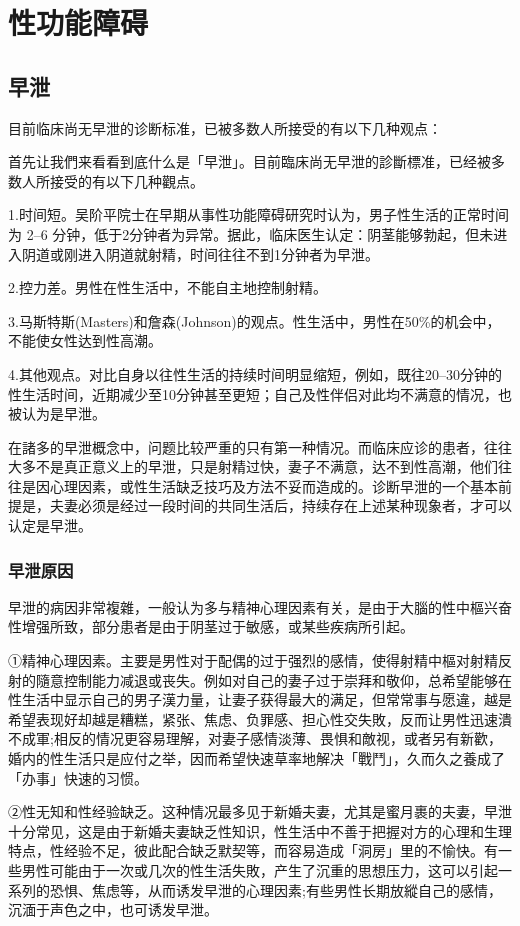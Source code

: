 \documentclass[12pt,UTF8]{ctexbook}
\begin{document}
\part{性功能障碍}

\chapter{早泄}

目前临床尚无早泄的诊断标准，已被多数人所接受的有以下几种观点：

首先让我們来看看到底什么是「早泄」。目前臨床尚无早泄的診斷標准，已经被多数人所接受的有以下几种觀点。

1.时间短。吴阶平院士在早期从事性功能障碍研究时认为，男子性生活的正常时间为 2--6 分钟，低于2分钟者为异常。据此，临床医生认定：阴茎能够勃起，但未进入阴道或刚进入阴道就射精，时间往往不到1分钟者为早泄。

2.控力差。男性在性生活中，不能自主地控制射精。

3.马斯特斯(Masters)和詹森(Johnson)的观点。性生活中，男性在50\%的机会中，不能使女性达到性高潮。

4.其他观点。对比自身以往性生活的持续时间明显缩短，例如，既往20--30分钟的性生活时间，近期减少至10分钟甚至更短；自己及性伴侣对此均不满意的情况，也被认为是早泄。

在諸多的早泄概念中，问题比较严重的只有第一种情况。而临床应诊的患者，往往大多不是真正意义上的早泄，只是射精过快，妻子不满意，达不到性高潮，他们往往是因心理因素，或性生活缺乏技巧及方法不妥而造成的。诊断早泄的一个基本前提是，夫妻必须是经过一段时间的共同生活后，持续存在上述某种现象者，才可以认定是早泄。

\section{早泄原因}

早泄的病因非常複雜，一般认为多与精神心理因素有关，是由于大腦的性中樞兴奋性增强所致，部分患者是由于阴茎过于敏感，或某些疾病所引起。

①精神心理因素。主要是男性对于配偶的过于强烈的感情，使得射精中樞对射精反射的隨意控制能力减退或丧失。例如对自己的妻子过于崇拜和敬仰，总希望能够在性生活中显示自己的男子漢力量，让妻子获得最大的满足，但常常事与愿違，越是希望表现好却越是糟糕，紧张、焦虑、负罪感、担心性交失敗，反而让男性迅速潰不成軍;相反的情况更容易理解，对妻子感情淡薄、畏惧和敵视，或者另有新歡，婚内的性生活只是应付之举，因而希望快速草率地解决「戰鬥」，久而久之養成了「办事」快速的习惯。

②性无知和性经验缺乏。这种情况最多见于新婚夫妻，尤其是蜜月裹的夫妻，早泄十分常见，这是由于新婚夫妻缺乏性知识，性生活中不善于把握对方的心理和生理特点，性经验不足，彼此配合缺乏默契等，而容易造成「洞房」里的不愉快。有一些男性可能由于一次或几次的性生活失敗，产生了沉重的思想压力，这可以引起一系列的恐惧、焦虑等，从而诱发早泄的心理因素;有些男性长期放縱自己的感情，沉湎于声色之中，也可诱发早泄。
\end{document}
